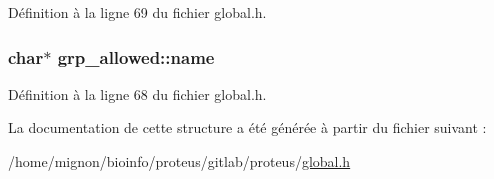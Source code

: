 Définition à la ligne 69 du fichier global.\+h.

\hypertarget{structgrp__allowed_a6b9ee6d59b5d30d4554f4e12f2423c3d}{
\subsubsection[{name}]{\setlength{\rightskip}{0pt plus 5cm}char$\ast$ grp\+\_\+allowed\+::name}}\label{structgrp__allowed_a6b9ee6d59b5d30d4554f4e12f2423c3d}


Définition à la ligne 68 du fichier global.\+h.



La documentation de cette structure a été générée à partir du fichier suivant \+:\begin{DoxyCompactItemize}
\item 
/home/mignon/bioinfo/proteus/gitlab/proteus/\hyperlink{global_8h}{global.\+h}\end{DoxyCompactItemize}
